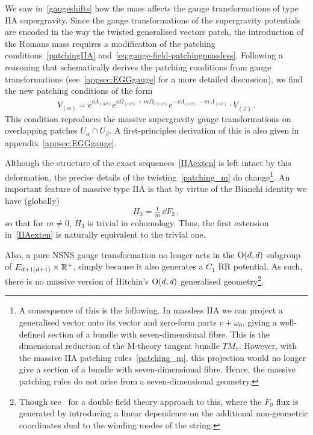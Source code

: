\documentclass[debug]{phd}
\begin{document}
						We saw in~\eqref{gaugeshifts} how the mass affects the gauge transformations of type IIA supergravity.
						Since the gauge transformations of the supergravity potentials are encoded in the way the twisted generalised vectors patch, the introduction of the Romans mass requires a modification of the patching conditions~\eqref{patchingIIA} and~\eqref{eq:gauge-field-patchingmassless}.
						Following a reasoning that schematically derives the patching conditions from gauge transformations (see~\cref{appsec:EGGgauge} for a more detailed discussion), we find the new patching conditions of the form
								\begin{equation}\label{patching_m}
									V_{(\alpha)} = e^{\dd \tilde \Lambda_{(\alpha \beta)}} e^{\dd \Omega_{(\alpha \beta)} + m \Omega_{6(\alpha\beta)} } e^{-\dd \Lambda_{(\alpha \beta)} - m\,\Lambda_{(\alpha\beta)}} \cdot V_{(\beta)} \, .
								\end{equation}
						This condition reproduces the massive supergravity gauge transformations on overlapping patches $U_\alpha \cap U_\beta$.
						A first-principles derivation of this is also given in appendix~\ref{appsec:EGGgauge}.
						
						Although the structure of the exact sequences~\eqref{IIAexten} is left intact by this deformation, the precise details of the twisting~\eqref{patching_m} do change\footnote{%
							A consequence of this is the following. In massless IIA we can project a generalised vector onto its vector and zero-form parts $v+\omega_0$, giving a well-defined section of a bundle with seven-dimensional fibre. This is the dimensional reduction of the M-theory tangent bundle $TM_7$. However, with the massive IIA patching rules~\eqref{patching_m}, this projection would no longer give a section of a bundle with seven-dimensional fibre. Hence, the massive patching rules do not arise from a seven-dimensional geometry.%
							}.
 						An important feature of massive type IIA is that by virtue of the Bianchi identity we have (globally)
								\begin{equation}\label{eq:H-exact}
									H_3 = \tfrac{1}{m}\, \dd F_2 \, ,
								\end{equation}
						so that for $m\neq 0$, $H_3$ is trivial in cohomology.
						Thus, the first extension in~\eqref{IIAexten} is naturally equivalent to the trivial one.
						
						Also, a pure NSNS gauge transformation no longer acts in the $\mathrm{O}(d,d)$ subgroup of $	E_{d+1(d+1)}\times\mathbb{R}^+$, simply because it also generates a $C_1$ RR potential.
						As such, there is no massive version of Hitchin's $\mathrm{O}(d,d)$ generalised geometry\footnote{%
							Though see~\cite{Hohm:2011cp} for a double field theory approach to this, where the $F_0$ flux is generated by introducing a linear dependence on the additional non-geometric coordinates dual to the winding modes of the string.%
							}.
\end{document}
